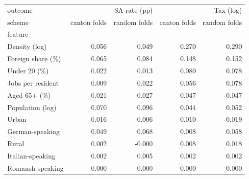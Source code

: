 \begin{tabular}{lrrrr}
\toprule
outcome & \multicolumn{2}{r}{SA rate (pp)} & \multicolumn{2}{r}{Tax (log)} \\
scheme & canton folds & random folds & canton folds & random folds \\
feature &  &  &  &  \\
\midrule
Density (log) & 0.056 & 0.049 & 0.270 & 0.290 \\
Foreign share (\%) & 0.065 & 0.084 & 0.148 & 0.152 \\
Under 20 (\%) & 0.022 & 0.013 & 0.080 & 0.078 \\
Jobs per resident & 0.009 & 0.022 & 0.056 & 0.078 \\
Aged 65+ (\%) & 0.021 & 0.027 & 0.047 & 0.047 \\
Population (log) & 0.070 & 0.096 & 0.044 & 0.052 \\
Urban & -0.016 & 0.006 & 0.010 & 0.019 \\
German-speaking & 0.049 & 0.068 & 0.008 & 0.058 \\
Rural & 0.002 & -0.000 & 0.008 & 0.018 \\
Italian-speaking & 0.002 & 0.005 & 0.002 & 0.002 \\
Romansh-speaking & 0.000 & 0.000 & 0.000 & 0.000 \\
\bottomrule
\end{tabular}
